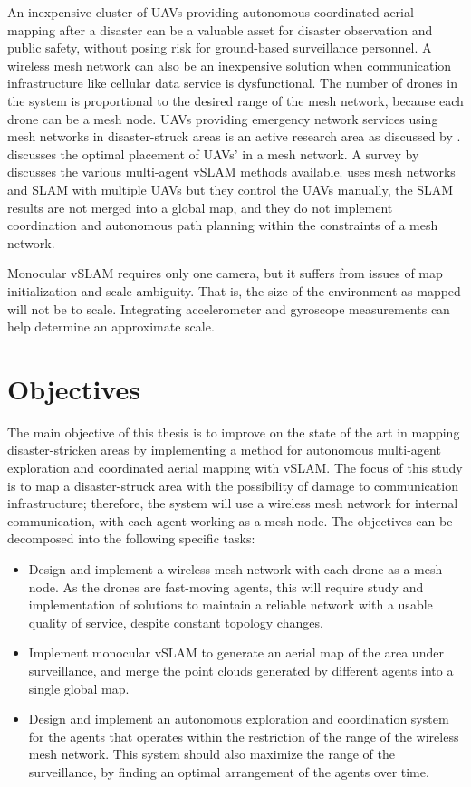 An inexpensive cluster of UAVs providing autonomous coordinated aerial mapping after a disaster can be a valuable asset for disaster observation and public safety, without posing risk for ground-based surveillance personnel. A wireless mesh network can also be an inexpensive solution when communication infrastructure like cellular data service is dysfunctional. The number of drones in the system is proportional to the desired range of the mesh network, because each drone can be a mesh node. UAVs providing emergency network services using mesh networks in disaster-struck areas is an active research area as discussed by  .  discusses the optimal placement of UAVs' in a mesh network. A survey by  discusses the various multi-agent vSLAM methods available.  uses mesh networks and SLAM with multiple UAVs but they control the UAVs manually, the SLAM results are not merged into a global map, and they do not implement coordination and autonomous path planning within the constraints of a mesh network.

Monocular vSLAM requires only one camera, but it suffers from issues of map initialization and scale ambiguity. That is, the size of the environment as mapped will not be to scale. Integrating accelerometer and gyroscope measurements can help determine an approximate scale.


\section{Objectives}


The main objective of this thesis is to improve on the state of the art in mapping disaster-stricken areas by implementing a method for autonomous multi-agent exploration and coordinated aerial mapping with vSLAM. The focus of this study is to map a disaster-struck area with the possibility of damage to communication infrastructure; therefore, the system will use a wireless mesh network for internal communication, with each agent working as a mesh node. The objectives can be decomposed into the following specific tasks:
\begin{itemize}
	\item Design and implement a wireless mesh network with each drone as a mesh node. As the drones are fast-moving agents, this will require study and implementation of solutions to maintain a reliable network with a usable quality of service, despite constant topology changes.
	\item Implement monocular vSLAM to generate an aerial map of the area under surveillance, and merge the point clouds generated by different agents into a single global map.
	\item Design and implement an autonomous exploration and coordination system for the agents that operates within the restriction of the range of the wireless mesh network. This system should also maximize the range of the surveillance, by finding an optimal arrangement of the agents over time.
\end{itemize}

